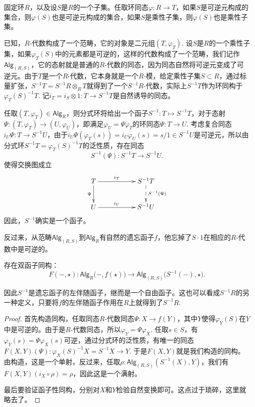 \para 固定环$R$，以及设$S$是$R$的一个子集。任取环同态$\varphi:R\to T$，如果$S$是可逆元构成的集合，则$\varphi(S)$也是可逆元构成的集合，如果$S$是乘性子集，则$\varphi(S)$也是乘性子集。

已知，$R$-代数构成了一个范畴，它的对象是二元组$(T,\varphi_T)$. 设$S$是$R$的一个乘性子集，如果$\varphi_T(S)$中的元素都是可逆的，这样的代数构成了一个范畴，我们记作$\mathsf{Alg}_{(R,S)}$，它的态射就是普通的$R$-代数的同态，因为同态自然将可逆元变成了可逆元。由于$T$是一个$R$-代数，它本身就是一个$R$-模，给定乘性子集$S\subset R$，通过标量扩张，$S^{-1}T=S^{-1}R\otimes_R T$就得到了一个$S^{-1}R$-代数，实际上$S^{-1}T$作为环同构于$\varphi_T(S)^{-1}T$. 记$i_T=i_S\otimes 1:T\to S^{-1}T$是自然诱导的同态。

任取$(T,\varphi_T)\in \mathsf{Alg}_R$，则分式环将给出一个函子$S^{-1}:T\mapsto S^{-1}T$，对于态射$\Psi:(T,\varphi_T)\to (U,\varphi_U)$，即满足$\varphi_U=\Psi\varphi_T$的环同态$\Psi:T\to U$. 考虑复合同态$i_{U}\Psi:T\to S^{-1}U$，由于$i_{U}\Psi(\varphi_T(s))=i_{U}\varphi_U(s)=s/1\in S^{-1}U$是可逆元，所以由分式环$S^{-1}T=\varphi_T(S)^{-1}T$的泛性质，存在同态
\[
	S^{-1}(\Psi):S^{-1}T\to S^{-1}U.
\]
使得交换图成立
\[
\begin{xy}
	\xymatrix{
		T\ar[rr]^-{i_T} \ar[d]_-{\Psi}&&S^{-1}T \ar@{-->}[d]^-{S^{-1}(\Psi)}\\
		U\ar[rr]^-{i_U} &&S^{-1}U
	}
\end{xy}
\]
因此，$S^{-1}$确实是一个函子。

反过来，从范畴$\mathsf{Alg}_{(R,S)}$到$\mathsf{Alg}_R$有自然的遗忘函子$f$，他忘掉了$S\cdot 1$在相应的$R$-代数中是可逆的。

\begin{thm}
存在双函子同构：
\[
	F(-,\star):\mathsf{Alg}_R\bigl(-,f(\star)\bigr)\to \mathsf{Alg}_{(R,S)}\bigl(S^{-1}(-),\star\bigr).
\]
\end{thm}

因此$S^{-1}$是遗忘函子的左伴随函子，继而是一个自由函子。这也可以看成$S^{-1}R$的另一种定义，只要将$f$的左伴随函子作用在$R$上就得到了$S^{-1}R$.

\begin{proof}
	首先构造同构，任取同态$R$-代数同态$\Psi:X\to f(Y)$，其中$Y$使得$\varphi_Y(S)$在$Y$中是可逆的。由于是$R$-代数同态，所以$\varphi_Y=\Psi\varphi_X$. 任取$s\in S$，有$\varphi_Y(s)=\Psi\varphi_X(s)$可逆，通过分式环的泛性质，有唯一的同态$F(X,Y)(\Psi):\varphi_X(S)^{-1}X=S^{-1}X\to Y$. 于是$F(X,Y)$就是我们构造的同构。由构造，这是一个单射，反过来，任取$\rho:\mathsf{Alg}_{(R,S)}(S^{-1}(X),Y)$，我们有$F(X,Y)(i_X\circ \rho)=\rho$，因此这是一个满射。

	最后要验证函子性同构，分别对$X$和$Y$检验自然变换即可。这点过于琐碎，这里就略去了。
\end{proof}

